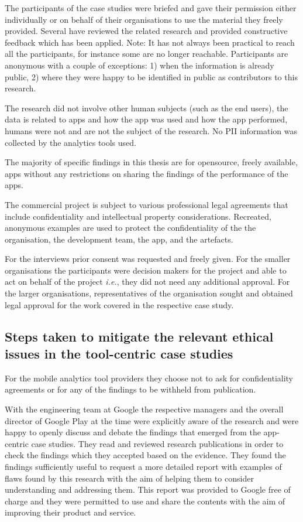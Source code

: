 The participants of the case studies were briefed and gave their permission either individually or on behalf of their organisations to use the material they freely provided. Several have reviewed the related research and provided constructive feedback which has been applied. 
Note: It has not always been practical to reach all the participants, for instance some are no longer reachable.
%
Participants are anonymous with a couple of exceptions: 1) when the information is already public, 2) where they were happy to be identified in public as contributors to this research.  

The research did not involve other human subjects (such as the end users), the data is related to apps and how the app was used and how the app performed, humans were not and are not the subject of the research. No PII information was collected by the analytics tools used.

The majority of specific findings in this thesis are for opensource, freely available, apps without any restrictions on sharing the findings of the performance of the apps. 

The commercial project is subject to various professional legal agreements that include confidentiality and intellectual property considerations. Recreated, anonymous examples are used to protect the confidentiality of the the organisation, the development team, the app, and the artefacts.

For the interviews prior consent was requested and freely given. For the smaller organisations the participants were decision makers for the project and able to act on behalf of the project \textit{i.e.}, they did not need any additional approval. For the larger organisations, representatives of the organisation sought and obtained legal approval for the work covered in the respective case study.


\subsection{Steps taken to mitigate the relevant ethical issues in the tool-centric case studies}
For the mobile analytics tool providers they choose not to ask for confidentiality agreements or for any of the findings to be withheld from publication. 

With the engineering team at Google the respective managers and the overall director of Google Play at the time were explicitly aware of the research and were happy to openly discuss and debate the findings that emerged from the app-centric case studies. They read and reviewed research publications in order to check the findings which they accepted based on the evidence. They found the findings sufficiently useful to request a more detailed report with examples of flaws found by this research with the aim of helping them to consider understanding and addressing them. This report was provided to Google free of charge and they were permitted to use and share the contents with the aim of improving their product and service.

